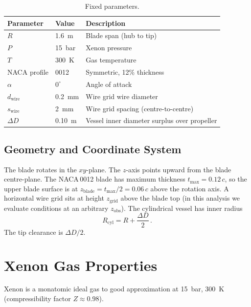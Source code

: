 \documentclass[11pt,a4paper]{article}
\begin{document}
\begin{table}[H]
\centering
\caption{Fixed parameters.}
\label{tab:fixed}
\begin{tabular}{lll}
\toprule
Parameter & Value & Description \\
\midrule
$R$            & \SI{1.6}{m}        & Blade span (hub to tip) \\
$P$            & \SI{15}{bar}       & Xenon pressure \\
$T$            & \SI{300}{K}        & Gas temperature \\
NACA profile   & 0012               & Symmetric, 12\% thickness \\
$\alpha$       & $0^\circ$          & Angle of attack \\
$d_\mathrm{wire}$  & \SI{0.2}{mm}  & Wire grid wire diameter \\
$s_\mathrm{wire}$  & \SI{2}{mm}    & Wire grid spacing (centre-to-centre) \\
$\Delta D$     & \SI{0.10}{m}       & Vessel inner diameter surplus over propeller \\
\bottomrule
\end{tabular}
\end{table}

\subsection{Geometry and Coordinate System}

The blade rotates in the $xy$-plane. The $z$-axis points upward from
the blade centre-plane. The NACA\,0012 blade has maximum thickness
$t_\mathrm{max} = 0.12\,c$, so the upper blade surface is at
$z_\mathrm{blade} = t_\mathrm{max}/2 = 0.06\,c$ above the rotation
axis. A horizontal wire grid sits at height $z_\mathrm{grid}$ above
the blade top (in this analysis we evaluate conditions at an arbitrary
$z_\mathrm{obs}$). The cylindrical vessel has inner radius
\begin{equation}
  R_\mathrm{cyl} = R + \frac{\Delta D}{2}\,.
\end{equation}
The tip clearance is $\Delta D / 2$.


\section{Xenon Gas Properties}
\label{sec:gas}

Xenon is a monatomic ideal gas to good approximation at \SI{15}{bar},
\SI{300}{K} (compressibility factor $Z \approx 0.98$).
\end{document}

